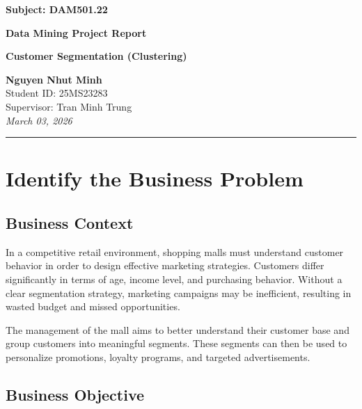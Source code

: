 \documentclass[12pt,a4paper]{article}
\begin{document}

\begin{center}
    \textbf{\Large Subject: DAM501.22}

    \vspace{0.5cm}

    \textbf{\Large Data Mining Project Report}

    \vspace{0.5cm}

    \textbf{\Huge Customer Segmentation (Clustering)}

    \vspace{0.8cm}

    \textbf{Nguyen Nhut Minh} \\
    Student ID: 25MS23283 \\
    Supervisor: Tran Minh Trung \\[1cm]

    \textit{March 03, 2026}
\end{center}

\vspace{0.8cm}
\hrule
\vspace{0.8cm}


\section{Identify the Business Problem}

\subsection{Business Context}

In a competitive retail environment, shopping malls must understand customer behavior in order to design effective marketing strategies. Customers differ significantly in terms of age, income level, and purchasing behavior. Without a clear segmentation strategy, marketing campaigns may be inefficient, resulting in wasted budget and missed opportunities.

The management of the mall aims to better understand their customer base and group customers into meaningful segments. These segments can then be used to personalize promotions, loyalty programs, and targeted advertisements.

\subsection{Business Objective}
\end{document}
